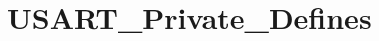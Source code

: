 \hypertarget{group___u_s_a_r_t___private___defines}{\section{U\-S\-A\-R\-T\-\_\-\-Private\-\_\-\-Defines}
\label{group___u_s_a_r_t___private___defines}
}
